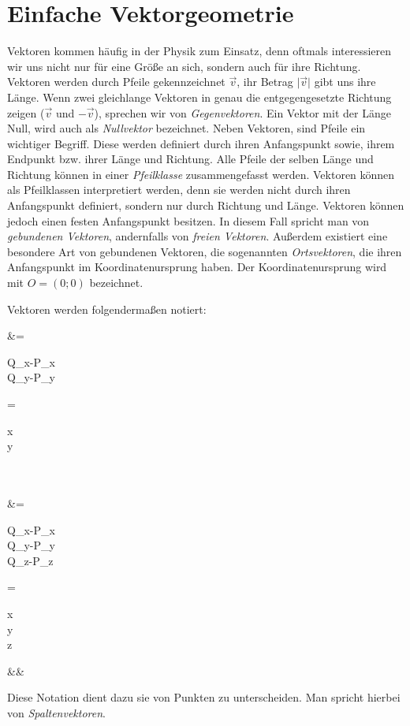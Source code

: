 \documentclass[12pt]{article}
\begin{document}
	\section{Einfache Vektorgeometrie}
	\label{sec:vektorgeometrie}
		Vektoren kommen häufig in der Physik zum Einsatz, denn oftmals interessieren wir uns nicht nur für eine Größe an sich, sondern auch für ihre Richtung. Vektoren werden durch Pfeile gekennzeichnet $\vec v$, ihr Betrag $\vert\vec v\vert$ gibt uns ihre Länge. Wenn zwei gleichlange Vektoren in genau die entgegengesetzte Richtung zeigen ($\vec v$ und $-\vec v$), sprechen wir von \textit{Gegenvektoren}. Ein Vektor mit der Länge Null, wird auch als \textit{Nullvektor} bezeichnet. Neben Vektoren, sind Pfeile ein wichtiger Begriff. Diese werden definiert durch ihren Anfangspunkt sowie, ihrem Endpunkt bzw. ihrer Länge und Richtung. Alle Pfeile der selben Länge und Richtung können in einer \textit{Pfeilklasse} zusammengefasst werden. Vektoren können als Pfeilklassen interpretiert werden, denn sie werden nicht durch ihren Anfangspunkt definiert, sondern nur durch Richtung und Länge. Vektoren können jedoch einen festen Anfangspunkt besitzen. In diesem Fall spricht man von \textit{gebundenen Vektoren}, andernfalls von \textit{freien Vektoren}. Außerdem existiert eine besondere Art von gebundenen Vektoren, die sogenannten \textit{Ortsvektoren}, die ihren Anfangspunkt im Koordinatenursprung haben. Der Koordinatenursprung wird mit $O=(0;0)$ bezeichnet.
		\begin{tcolorbox}[boxsep=0pt,top=.75cm,left=1cm,right=1cm, bottom=.75cm,arc=0pt,auto outer arc,colback=white,colframe=black, enlarge top by=.25cm, enlarge bottom by=.25cm]
			Vektoren werden folgendermaßen notiert:
			\begin{flalign*}
				&=\begin{pmatrix}Q_x-P_x\\Q_y-P_y\end{pmatrix}=\begin{pmatrix}x\\y\end{pmatrix}\\\\
				&=\begin{pmatrix}Q_x-P_x\\Q_y-P_y\\Q_z-P_z\end{pmatrix}=\begin{pmatrix}x\\y\\z\end{pmatrix}&&
			\end{flalign*}
			Diese Notation dient dazu sie von Punkten zu unterscheiden. Man spricht hierbei von \textit{Spaltenvektoren}.
		\end{tcolorbox}
\end{document}
